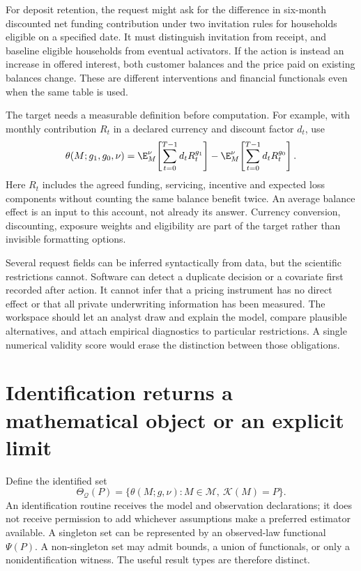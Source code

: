 For deposit retention, the request might ask for the difference in
six-month discounted net funding contribution under two invitation
rules for households eligible on a specified date. It must distinguish
invitation from receipt, and baseline eligible households from eventual
activators. If the action is instead an increase in offered interest,
both customer balances and the price paid on existing balances change.
These are different interventions and financial functionals even when
the same table is used.

The target needs a measurable definition before computation. For example,
with monthly contribution $R_t$ in a declared currency and discount
factor $d_t$, use
\[
 \theta(M;g_1,g_0,\nu)
 =\E^\nu_M\!\left[\sum_{t=0}^{T-1}d_tR_t^{g_1}\right]
  -\E^\nu_M\!\left[\sum_{t=0}^{T-1}d_tR_t^{g_0}\right].
\]
Here $R_t$ includes the agreed funding, servicing, incentive and expected
loss components without counting the same balance benefit twice.
An average balance effect is an input to this account, not already its
answer. Currency conversion, discounting, exposure weights and eligibility
are part of the target rather than invisible formatting options.

Several request fields can be inferred syntactically from data, but the
scientific restrictions cannot. Software can detect a duplicate decision
or a covariate first recorded after action. It cannot infer that a pricing
instrument has no direct effect or that all private underwriting
information has been measured. The workspace should let an analyst draw
and explain the model, compare plausible alternatives, and attach empirical
diagnostics to particular restrictions. A single numerical validity score
would erase the distinction between those obligations.

\section{Identification returns a mathematical object or an explicit limit}
\label{r3:identification-interface}

Define the identified set
\[
 \Theta_{\mathcal Q}(P)=
 \{\theta(M;g,\nu):M\in\mathcal M,\ \mathcal K(M)=P\}.
\]
An identification routine receives the model and observation declarations;
it does not receive permission to add whichever assumptions make a preferred
estimator available. A singleton set can be represented by an observed-law
functional $\Psi(P)$. A non-singleton set may admit bounds, a union of
functionals, or only a nonidentification witness. The useful result types
are therefore distinct.

